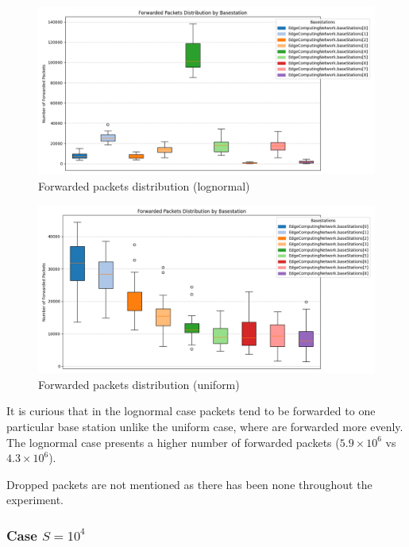 \documentclass{report}
\begin{document}
\begin{figure}[H]
    \centering
    \includegraphics[width=\textwidth]{img/plots/log_1e3_B/forwarded.png}
    \caption{Forwarded packets distribution (lognormal)}
\end{figure}

\begin{figure}[H]
    \centering
    \includegraphics[width=\textwidth]{img/plots/uni_1e3_B/forwarded.png}
    \caption{Forwarded packets distribution (uniform)}
\end{figure}

It is curious that in the lognormal case packets tend to be forwarded to one particular base station unlike the uniform case, where are forwarded more evenly. The lognormal case presents a higher number of forwarded packets ($5.9\times10^6$ vs $4.3\times10^6$).

Dropped packets are not mentioned as there has been none throughout the experiment.

\subsubsection*{Case $S=10^4$}
\end{document}
